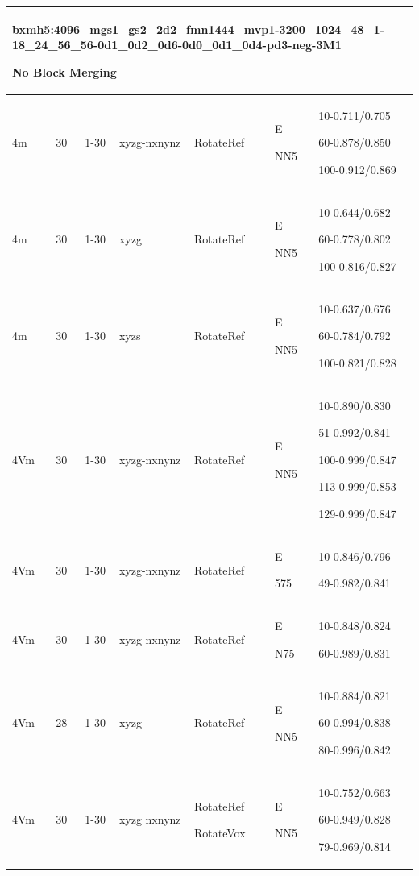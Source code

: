 \documentclass{article}
\begin{document}
\begin{tabular}{|p{1.5cm}|p{1.5cm}|p{1cm}|p{1.5cm}|p{1.5cm}|p{1.5cm}|p{5cm}| }
	\hline \hline
	\multicolumn{7}{|p{14cm}|}{bxmh5:4096\_mgs1\_gs2\_2d2\_fmn1444\_mvp1-3200\_1024\_48\_1-18\_24\_56\_56-0d1\_0d2\_0d6-0d0\_0d1\_0d4-pd3-neg-3M1\par No Block Merging 
	}\\
	\hline
	4m & 30 & 1-30 & xyzg-nxnynz & RotateRef & E\par NN5 & 10-0.711/0.705\par 60-0.878/0.850\par 100-0.912/0.869\\
	\hline 
	4m & 30 & 1-30 & xyzg & RotateRef & E\par NN5 & 10-0.644/0.682\par 60-0.778/0.802\par 100-0.816/0.827\\
	\hline 
	4m & 30 & 1-30 & xyzs & RotateRef & E\par NN5 & 10-0.637/0.676\par 60-0.784/0.792\par 100-0.821/0.828\\
	\hline 
	4Vm & 30 & 1-30 & xyzg-nxnynz & RotateRef & E\par NN5 & 10-0.890/0.830\par 51-0.992/0.841\par 100-0.999/0.847\par 113-0.999/0.853\par 129-0.999/0.847\\
	\hline 
	4Vm & 30 & 1-30 & xyzg-nxnynz & RotateRef & E\par 575 & 10-0.846/0.796\par 49-0.982/0.841\\
	\hline 
	4Vm & 30 & 1-30 & xyzg-nxnynz & RotateRef & E\par N75 & 10-0.848/0.824\par 60-0.989/0.831\\
	\hline
	4Vm & 28 & 1-30 & xyzg & RotateRef & E\par NN5 & 10-0.884/0.821\par 60-0.994/0.838\par 80-0.996/0.842\\
	\hline 
	4Vm & 30 & 1-30 & xyzg nxnynz & RotateRef\par RotateVox & E\par NN5 & 10-0.752/0.663\par 60-0.949/0.828\par 79-0.969/0.814\\
	\hline \hline
	

\end{tabular}
\end{document}
